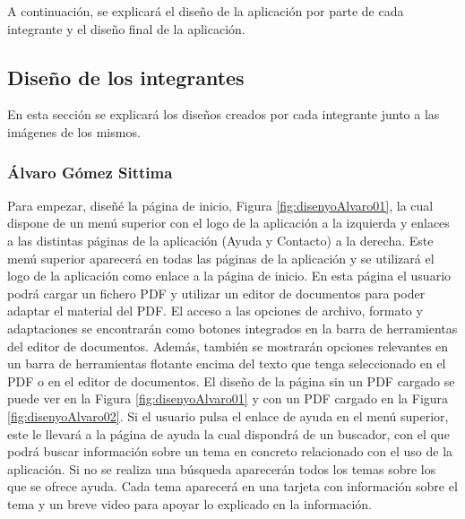 A continuación, se explicará el diseño de la aplicación por parte de cada integrante y el diseño final de la aplicación.
\subsection{Diseño de los integrantes}
En esta sección se explicará los diseños creados por cada integrante junto a las imágenes de los mismos. 

\subsubsection{Álvaro Gómez Sittima}
Para empezar, diseñé la página de inicio, Figura \ref{fig:disenyoAlvaro01}, la cual dispone de un menú superior con el logo de la aplicación a la izquierda y enlaces a las distintas páginas de la aplicación (Ayuda y Contacto) a la derecha. Este menú superior aparecerá en todas las páginas de la aplicación y se utilizará el logo de la aplicación como enlace a la página de inicio. En esta página el usuario podrá cargar un fichero PDF y utilizar un editor de documentos para poder adaptar el material del PDF. El acceso a las opciones de archivo, formato y adaptaciones se encontrarán como botones integrados en la barra de herramientas del editor de documentos. Además, también se mostrarán opciones relevantes en un barra de herramientas flotante encima del texto que tenga seleccionado en el PDF o en el editor de documentos. El diseño de la página sin un PDF cargado se puede ver en la Figura \ref{fig:disenyoAlvaro01} y con un PDF cargado en la Figura \ref{fig:disenyoAlvaro02}. Si el usuario pulsa el enlace de ayuda en el menú superior, este le llevará a la página de ayuda la cual dispondrá de un buscador, con el que podrá buscar información sobre un tema en concreto relacionado con el uso de la aplicación. Si no se realiza una búsqueda aparecerán todos los temas sobre los que se ofrece ayuda. Cada tema aparecerá en una tarjeta con información sobre el tema y un breve video para apoyar lo explicado en la información.

